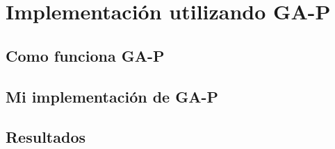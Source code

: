 \section{Implementación utilizando GA-P}

\subsection{Como funciona GA-P}

\subsection{Mi implementación de GA-P}

\subsection{Resultados}
